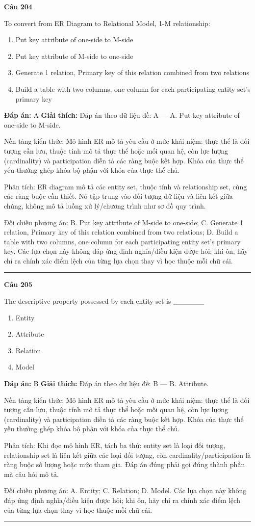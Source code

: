 \documentclass[11pt,a4paper]{article}
\newenvironment{question}[1]{%
  \par\vspace{1em}\noindent\textbf{\large Câu #1}\par\vspace{0.4em}
}{%
  \par\vspace{1em}\hrule\vspace{0.6em}
}
\newenvironment{choices}{%
  \begin{enumerate}[label=\textbf{\Alph*.},leftmargin=2.2em,itemsep=2pt,topsep=3pt]
}{%
  \end{enumerate}
}
\newcommand{\choice}{\item}
\begin{document}
\begin{question}{204}
To convert from ER Diagram to Relational Model, 1-M relationship:
\begin{choices}
\choice Put key attribute of one-side to M-side
\choice Put key attribute of M-side to one-side
\choice Generate 1 relation, Primary key of this relation combined from two relations
\choice Build a table with two columns, one column for each participating entity set's primary key
\end{choices}
\textbf{Đáp án:} A
\textbf{Giải thích:} Đáp án theo dữ liệu đề: A — A. Put key attribute of one-side to M-side.

Nền tảng kiến thức: Mô hình ER mô tả yêu cầu ở mức khái niệm: thực thể là đối tượng cần lưu, thuộc tính mô tả thực thể hoặc mối quan hệ, còn lực lượng (cardinality) và participation diễn tả các ràng buộc kết hợp. Khóa của thực thể yếu thường ghép khóa bộ phận với khóa của thực thể chủ.

Phân tích: ER diagram mô tả các entity set, thuộc tính và relationship set, cùng các ràng buộc cần thiết. Nó tập trung vào đối tượng dữ liệu và liên kết giữa chúng, không mô tả luồng xử lý/chương trình như sơ đồ quy trình.

Đối chiếu phương án: B. Put key attribute of M-side to one-side; C. Generate 1 relation, Primary key of this relation combined from two relations; D. Build a table with two columns, one column for each participating entity set's primary key. Các lựa chọn này không đáp ứng định nghĩa/điều kiện được hỏi; khi ôn, hãy chỉ ra chính xác điểm lệch của từng lựa chọn thay vì học thuộc mỗi chữ cái.
\end{question}

\begin{question}{205}
The descriptive property possessed by each entity set is ______
\begin{choices}
\choice Entity
\choice Attribute
\choice Relation
\choice Model
\end{choices}
\textbf{Đáp án:} B
\textbf{Giải thích:} Đáp án theo dữ liệu đề: B — B. Attribute.

Nền tảng kiến thức: Mô hình ER mô tả yêu cầu ở mức khái niệm: thực thể là đối tượng cần lưu, thuộc tính mô tả thực thể hoặc mối quan hệ, còn lực lượng (cardinality) và participation diễn tả các ràng buộc kết hợp. Khóa của thực thể yếu thường ghép khóa bộ phận với khóa của thực thể chủ.

Phân tích: Khi đọc mô hình ER, tách ba thứ: entity set là loại đối tượng, relationship set là liên kết giữa các loại đối tượng, còn cardinality/participation là ràng buộc số lượng hoặc mức tham gia. Đáp án đúng phải gọi đúng thành phần mà câu hỏi mô tả.

Đối chiếu phương án: A. Entity; C. Relation; D. Model. Các lựa chọn này không đáp ứng định nghĩa/điều kiện được hỏi; khi ôn, hãy chỉ ra chính xác điểm lệch của từng lựa chọn thay vì học thuộc mỗi chữ cái.
\end{question}
\end{document}
